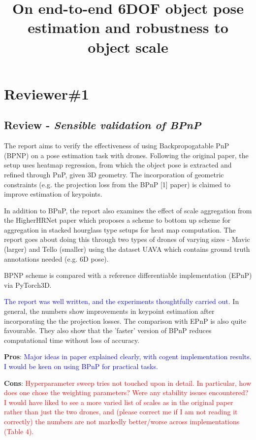 \documentclass{article}
\title{On end-to-end 6DOF object pose estimation and robustness to object scale}
\begin{document}
\maketitle

\section{Reviewer\#1}
\subsection{Review - \textit{Sensible validation of BPnP}}

The report aims to verify the effectiveness of using Backpropogatable PnP (BPNP) on a pose estimation task with drones.
Following the original paper, the setup uses heatmap regression, from which the object pose is extracted and refined through PnP, given 3D geometry. 
The incorporation of geometric constraints (e.g. the projection loss from the BPnP [1] paper) is claimed to improve estimation of keypoints.

In addition to BPnP, the report also examines the effect of scale aggregation from the HigherHRNet paper which proposes a scheme to bottom up scheme for aggregation in stacked hourglass type setups for heat map computation. 
The report goes about doing this through two types of drones of varying sizes - Mavic (larger) and Tello (smaller) using the dataset UAVA which contains ground truth annotations needed (e.g. 6D pose).

BPNP scheme is compared with a reference differentiable implementation (EPnP) via PyTorch3D.

\textcolor{blue}{The report was well written, and the experiments thoughtfully carried out.}
In general, the numbers show improvements in keypoint estimation after incorporating the the projection losses. 
The comparison with EPnP is also quite favourable. 
They also show that the 'faster' version of BPnP reduces computational time without loss of accuracy.

\textbf{Pros}: \textcolor{blue}{Major ideas in paper explained clearly, with cogent implementation results. I would be keen on using BPnP for practical tasks.}

\textbf{Cons}: \textcolor{red}{Hyperparameter sweep tries not touched upon in detail. In particular, how does one chose the weighting parameters? Were any stability issues encountered? I would have liked to see a more varied list of scales as in the original paper rather than just the two drones, and (please correct me if I am not reading it correctly) the numbers are not markedly better/worse across implementations (Table 4).}
\end{document}
